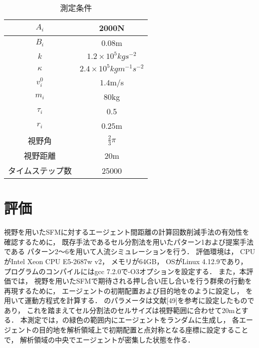 \begin{table}[tb]
  \begin{center}
    \caption{測定条件}
    \label{tb:tab_para}
    \begin{tabular}{c|c}
      \hline \hline
      $A_i$            & 2000N                              \\ \hline 
      $B_i$            & 0.08m                              \\ \hline 
      $k$              & $1.2 \times 10^5 kg s^{-2} $       \\ \hline 
      $\kappa$         & $2.4 \times 10^5 kg m^{-1} s^{-2}$ \\ \hline 
      $v_i^0$          & $1.4$m/s                           \\ \hline 
      $m_i$            & $80$kg                             \\ \hline 
      $\tau_i$         & 0.5                               \\ \hline 
      $r_i$            & $0.25$m                            \\ \hline 
		視野角         & $\frac{2}{3}\pi$                   \\ \hline 
      視野距離         & $20$m                              \\ \hline 
      タイムステップ数 & 25000                              \\ \hline
    \end{tabular}
  \end{center}
\end{table}


\section{評価}
視野を用いたSFMに対するエージェント間距離の計算回数削減手法の有効性を確認するために，
既存手法であるセル分割法を用いたパターン1および提案手法である
パターン2～6を用いて人流シミュレーションを行う．
評価環境は，
CPUがIntel Xeon CPU E5-2687w v2， 
メモリが64GB，
OSがLinux 4.12.9であり，
プログラムのコンパイルにはgcc 7.2.0で-O3オプションを設定する．
また，本評価では，
視野を用いたSFMで期待される押し合い圧し合いを行う群衆の行動を再現するために，
エージェントの初期配置および目的地をのように設定し，
を用いて運動方程式を計算する．%
のパラメータは文献[49]を参考に設定したものであり，
これを踏まえてセル分割法のセルサイズは視野範囲に合わせて20mとする．
本測定では，の緑色の範囲内にエージェントをランダムに生成し，
各エージェントの目的地を解析領域上で初期配置と点対称となる座標に設定することで，
解析領域の中央でエージェントが密集した状態を作る．

